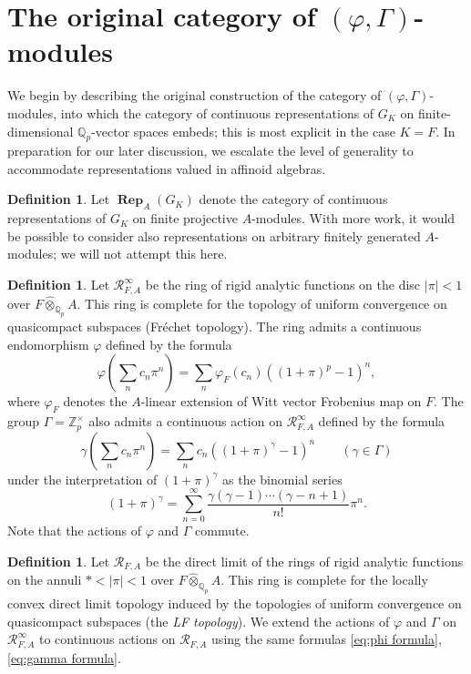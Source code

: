 \documentclass[12pt]{amsart}
\theoremstyle{definition}
\newtheorem{defn}[theorem]{Definition}
\numberwithin{equation}{theorem}
\newcommand{\QQ}{\mathbb{Q}}
\newcommand{\ZZ}{\mathbb{Z}}
\newcommand{\calR}{\mathcal{R}}
\DeclareMathOperator{\Rep}{\mathbf{Rep}}
\begin{document}
\section{The original category of $(\varphi, \Gamma)$-modules}
\label{sec:categories}

We begin by describing the original construction of the category of $(\varphi, \Gamma)$-modules,
into which the category of continuous representations of $G_K$ on finite-dimensional $\QQ_p$-vector spaces embeds; this is most explicit in the case $K=F$.
In preparation for our later discussion, we escalate the level of generality to accommodate representations valued in affinoid algebras.

\begin{defn}
Let $\Rep_A(G_K)$ denote the category of continuous representations of $G_K$ on finite projective $A$-modules. With more work, it would be possible to consider also representations on arbitrary finitely generated $A$-modules; we will not attempt this here.
\end{defn}

\begin{defn}
Let $\calR^\infty_{F,A}$ be the ring of rigid analytic functions on the disc $\left| \pi \right| < 1$ over $F \widehat{\otimes}_{\QQ_p} A$. This ring is complete for the topology of uniform convergence on quasicompact subspaces (Fr\'echet topology). The ring admits a continuous endomorphism $\varphi$ defined by the formula
\begin{equation} \label{eq:phi formula}
\varphi \left( \sum_n c_n \pi^n \right) =  \sum_n \varphi_F(c_n) ((1 + \pi)^p-1)^n,
\end{equation}
where $\varphi_F$ denotes the $A$-linear extension of Witt vector Frobenius map on $F$.
The group $\Gamma = \ZZ_p^\times$ also admits a continuous action on $\calR^\infty_{F,A}$ defined by the formula
\begin{equation} \label{eq:gamma formula}
\gamma \left( \sum_n c_n \pi^n \right) = \sum_n c_n ((1 + \pi)^\gamma-1)^n \qquad (\gamma \in \Gamma)
\end{equation}
under the interpretation of $(1 + \pi)^\gamma$ as the binomial series 
\[
(1 + \pi)^\gamma = \sum_{n=0}^\infty \frac{\gamma(\gamma-1)\cdots (\gamma-n+1)}{n!} \pi^n.
\]
Note that the actions of $\varphi$ and $\Gamma$ commute.
\end{defn}

\begin{defn}
Let $\calR_{F,A}$ be the direct limit of the rings of rigid analytic functions on the annuli $* < \left| \pi \right| < 1$ over $F \widehat{\otimes}_{\QQ_p} A$. This ring is complete for the locally convex direct limit topology induced by the topologies of uniform convergence on quasicompact subspaces (the \emph{LF topology}). We extend the actions of $\varphi$ and $\Gamma$ on $\calR^\infty_{F,A}$ to continuous actions on $\calR_{F,A}$ using the same formulas \eqref{eq:phi formula}, \eqref{eq:gamma formula}.
\end{defn}
\end{document}
